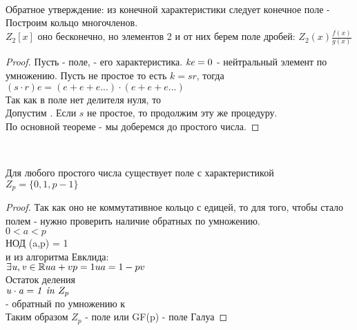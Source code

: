  \\
Обратное утверждение: из конечной характеристики следует конечное поле -
 \\

Построим кольцо многочленов. \\
$Z_{2}[x]$ оно бесконечно, но элементов 2 и от них берем поле дробей:
$Z_{2}(x) \frac{f(x)}{g(x)}$ \\

\begin{theorem}
\end{theorem}

\begin{proof}
	Пусть  - поле,  - его характеристика. $\mathit{ke}=0$  -
	нейтральный элемент по умножению. Пусть  не простое то есть $k = sr$,
	тогда $(s \cdot r)e = (e+e+e...) \cdot (e+e+e...)$ \\
	Так как в поле нет делителя нуля, то  \\
	Допустим . Если $s$ не простое, то продолжим эту же процедуру.\\
	По основной теореме - мы доберемся до простого числа.
\end{proof}

\\

\begin{theorem}[Галуа]
	Для любого простого числа  существует поле с характеристикой  \\
	$Z_{p} = \{0,1, p-1\}$
\end{theorem}

\begin{proof}
	Так как оно не коммутативное кольцо с едицей, то для того, чтобы стало полем -
	нужно проверить наличие обратных по умножению. \\
	$0<a<p$ \\
	НОД (a,p) = 1 \\
	и из алгоритма Евклида: \\
	$
	\exists \mathit {u,v} \in \mathbb {R} \\
	ua + vp = 1 \\
	ua = 1 - pv
	$ \\
	Остаток деления  \\
	$\mathit {u \cdot a = 1 ~in~} Z_{p}$ \\
	 - обратный по умножению к  \\
	Таким образом $Z_p$ - поле или GF(p) - поле Галуа
\end{proof}

